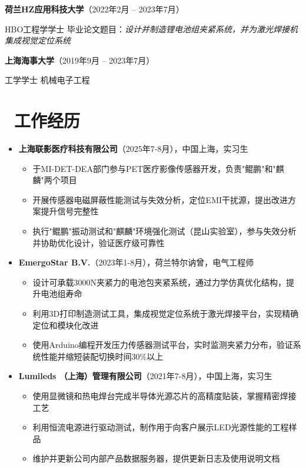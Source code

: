 \documentclass[11pt]{article}
\begin{document}
\textbf{荷兰HZ应用科技大学}（2022年2月 -- 2023年7月）

\qquad HBO工程学学士  
\quad 毕业论文题目：\emph{设计并制造锂电池组夹紧系统，并为激光焊接机集成视觉定位系统}

\textbf{上海海事大学}（2019年9月 -- 2023年7月）

\qquad 工学学士 \quad 机械电子工程

\section{\makebox[\widthof{\faGraduationCap}][c]{\color{CVBlue}\faBriefcase}\ 工作经历}
    \begin{itemize}
    \item \textbf{上海联影医疗科技有限公司}（2025年7-8月），中国上海，实习生
    \begin{itemize}
    \item 于MI-DET-DEA部门参与PET医疗影像传感器开发，负责"鲲鹏"和"麒麟"两个项目
    \item 开展传感器电磁屏蔽性能测试与失效分析，定位EMI干扰源，提出改进方案提升信号完整性
    \item 执行"鲲鹏"振动测试和"麒麟"环境强化测试（昆山实验室），参与失效分析并协助优化设计，验证医疗级可靠性
    \end{itemize}

	\item \textbf{EmergoStar B.V.}（2023年1-8月），荷兰特尔讷曾，电气工程师
    \begin{itemize}
    \item 设计可承载3000N夹紧力的电池包夹紧系统，通过力学仿真优化结构，提升电池组寿命
    \item 利用3D打印制造测试工具，集成视觉定位系统于激光焊接平台，实现精确定位和模块化改进
    \item 使用Arduino编程开发压力传感器测试平台，实时监测夹紧力分布，验证系统性能并缩短装配切换时间30\%以上
\end{itemize}
	\item \textbf{Lumileds （上海）管理有限公司}（2021年7-8月），中国上海，实习生
    \begin{itemize}
    \item 使用显微镜和热电焊台完成半导体光源芯片的高精度贴装，掌握精密焊接工艺
    \item 利用恒流电源进行驱动测试，制作用于向客户展示LED光源性能的工程样品
    \item 维护并更新公司内部产品数据服务器，提供更新日志及使用说明文档
    \end{itemize}
\end{itemize}
\end{document}

